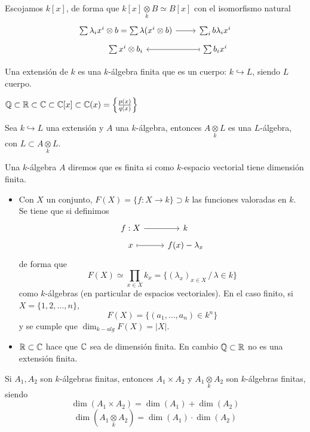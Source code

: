     \begin{ejem}
        Escojamos $k[x]$, de forma que $k[x] \underset{k}{\otimes} B \simeq B[x]$ con el isomorfismo natural
        $$\bt \sum \lambda_i x^i \otimes b =  \sum \lambda(x^i \otimes b) \rar & \sum_i b \lambda_i x^i \\[-5mm] \sum x^i \otimes b_i & \arrow[mapsto]{l} \sum b_i x^i \et$$
    \end{ejem}
    \begin{defi}
        Una extensi\'on de $k$ es una $k$-\'algebra finita que es un cuerpo: $k \hookrightarrow L$, siendo $L$ cuerpo.
    \end{defi}
    \begin{ejem}$\mathbb{Q} \subset \mathbb{R} \subset \mathbb{C} \subset \mathbb{C}[x] \subset \mathbb{C}(x) = \left\{\frac{p(x)}{q(x)}\right\}$
    \end{ejem}
    \begin{obs}
        Sea $k\hookrightarrow L$ una extensi\'on y $A$ una $k$-\'algebra, entonces $A\underset{k}{\otimes}L$ es una $L$-\'algebra, con $L\subset A\underset{k}{\otimes}L$. 
    \end{obs}
    \begin{defi}
        Una $k$-\'algebra $A$ diremos que es finita si como $k$-espacio vectorial tiene dimensi\'on finita. 
    \end{defi}
    \begin{ejem}
        \begin{itemize}
            \item Con $X$ un conjunto, $F(X)=\{f:X \longrightarrow k\} \supset k$ las funciones valoradas en $k$. Se tiene que si definimos 
        $$\bt f:X \rar & k \\[-5mm] x \rarmaps & f(x) - \lambda_x \et$$
        de forma que 
        $$F(X) \simeq \prod_{x\in X} k_x = \{(\lambda_x)_{x\in X} \, /\, \lambda \in k\}$$
        como $k$-\'algebras (en particular de espacios vectoriales). En el caso finito, si $X=\{1,2, \ldots, n\}$, 
        $$F(X) = \{(a_1, \ldots, a_n) \in k^n\}$$
        y se cumple que $\dim_{k-alg} F(X) = |X|$. 
        \item $\mathbb{R}\subset \mathbb{C}$ hace que $\mathbb{C}$ sea de dimensi\'on finita. En cambio $\mathbb{Q} \subset \mathbb{R}$ no es una extensi\'on finita.
        \end{itemize}
    \end{ejem}
    \begin{prop}
        Si $A_1,A_2$ son $k$-\'algebras finitas, entonces $A_1\times A_2$ y $A_1\underset{k}{\otimes} A_2$ son $k$-\'algebras finitas, siendo 
        $$\dim(A_1 \times A_2) = \dim(A_1) + \dim(A_2) $$
        $$\dim(A_1 \underset{k}{\otimes} A_2) = \dim(A_1) \cdot \dim(A_2)$$
    \end{prop}
